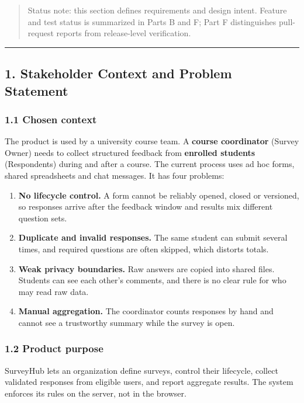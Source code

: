 \documentclass[12pt,a4paper]{article}
\begin{document}
\label{part-a-start}


\begin{quote}
Status note: this section defines requirements and design intent. Feature and test status is summarized in Parts B and F; Part F distinguishes pull-request reports from release-level verification.

\end{quote}

\medskip\noindent\rule{\linewidth}{0.4pt}\medskip

\subsection*{1. Stakeholder Context and Problem Statement}
\subsubsection*{1.1 Chosen context}
The product is used by a university course team. A \textbf{course coordinator} (Survey Owner) needs to collect structured feedback from \textbf{enrolled students} (Respondents) during and after a course. The current process uses ad hoc forms, shared spreadsheets and chat messages. It has four problems:

\begin{enumerate}[leftmargin=*]
\item \textbf{No lifecycle control.} A form cannot be reliably opened, closed or versioned, so responses arrive after the feedback window and results mix different question sets.
\item \textbf{Duplicate and invalid responses.} The same student can submit several times, and required questions are often skipped, which distorts totals.
\item \textbf{Weak privacy boundaries.} Raw answers are copied into shared files. Students can see each other's comments, and there is no clear rule for who may read raw data.
\item \textbf{Manual aggregation.} The coordinator counts responses by hand and cannot see a trustworthy summary while the survey is open.
\end{enumerate}

\subsubsection*{1.2 Product purpose}
SurveyHub lets an organization define surveys, control their lifecycle, collect validated responses from eligible users, and report aggregate results. The system enforces its rules on the server, not in the browser.
\end{document}
